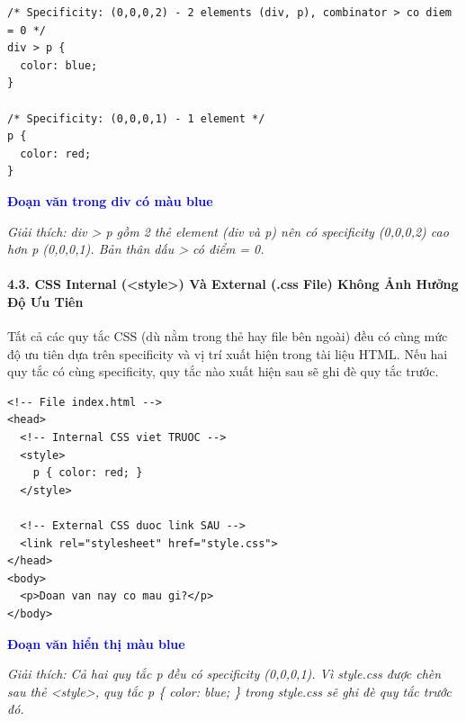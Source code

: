 \begin{codeWindow}
\begin{lstlisting}[language=CSS3]
/* Specificity: (0,0,0,2) - 2 elements (div, p), combinator > co diem = 0 */
div > p {
  color: blue;
}

/* Specificity: (0,0,0,1) - 1 element */
p {
  color: red;
}
\end{lstlisting}
\end{codeWindow}

\begin{browserWindow}
\sffamily\small
\textcolor{blue}{\textbf{Đoạn văn trong div có màu blue}} \par\vspace{4pt}
{\scriptsize\textcolor{gray!60}{\textit{Giải thích: div > p gồm 2 thẻ element (div và p) nên có specificity (0,0,0,2) cao hơn p (0,0,0,1). Bản thân dấu > có điểm = 0.}}}
\end{browserWindow}

\paragraph{4.3. CSS Internal (<style>) Và External (.css File) Không Ảnh Hưởng Độ Ưu Tiên}

\begin{conceptBox}
Tất cả các quy tắc CSS (dù nằm trong thẻ  hay file  bên ngoài) đều có cùng mức độ ưu tiên dựa trên specificity và vị trí xuất hiện trong tài liệu HTML. Nếu hai quy tắc có cùng specificity, quy tắc nào xuất hiện sau sẽ ghi đè quy tắc trước.
\end{conceptBox}

\begin{codeWindow}
\begin{lstlisting}[language=HTML5]
<!-- File index.html -->
<head>
  <!-- Internal CSS viet TRUOC -->
  <style>
    p { color: red; }
  </style>
  
  <!-- External CSS duoc link SAU -->
  <link rel="stylesheet" href="style.css">
</head>
<body>
  <p>Doan van nay co mau gi?</p>
</body>
\end{lstlisting}
\end{codeWindow}

\begin{browserWindow}
\sffamily\small
\textcolor{blue}{\textbf{Đoạn văn hiển thị màu blue}} \par\vspace{4pt}
{\scriptsize\textcolor{gray!60}{\textit{Giải thích: Cả hai quy tắc p đều có specificity (0,0,0,1). Vì style.css được chèn sau thẻ <style>, quy tắc p \{ color: blue; \} trong style.css sẽ ghi đè quy tắc trước đó.}}}
\end{browserWindow}

